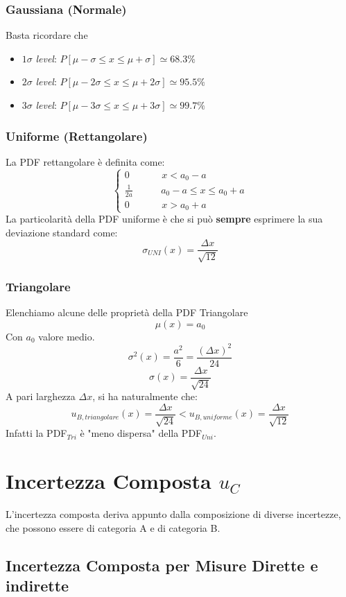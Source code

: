 \documentclass[a4paper,11pt]{report}
\begin{document}
\subsubsection{Gaussiana (Normale)}
Basta ricordare che
\begin{center}
\begin{itemize}
  \item $1\sigma$ \textit{level}: $P[\mu-\sigma \le x \le \mu+\sigma] \simeq 68.3\%$
  \item $2\sigma$ \textit{level}: $P[\mu-2\sigma \le x \le \mu+2\sigma] \simeq 95.5\%$
    \item $3\sigma$ \textit{level}: $P[\mu-3\sigma \le x \le \mu+3\sigma] \simeq 99.7\%$
\end{itemize}  
\end{center}
\subsubsection{Uniforme (Rettangolare)}
La PDF rettangolare è definita come:
\begin{equation}
   \begin{cases}
   0~~~~~~~~~~~~~~~x < a_0 -a\\
   \frac{1}{2a}~~~~~~~~~~~~~a_0 -a \le x \le a_0 + a\\
   0~~~~~~~~~~~~~~~x > a_0 +a
   \end{cases}
\end{equation}
La particolarità della PDF uniforme è che si può \textbf{sempre} esprimere la sua deviazione standard come:
$$
  \sigma_{UNI}(x) = \frac{\Delta x}{\sqrt{12}}
$$
\subsubsection{Triangolare}
Elenchiamo alcune delle proprietà della PDF Triangolare
$$
  \mu(x) = a_0
$$
Con $a_0$ valore medio.
$$
  \sigma^2(x) = \frac{a^2}{6} = \frac{(\Delta x)^2}{24}
$$
$$
  \sigma(x) = \frac{\Delta x}{\sqrt{24}}
$$
A pari larghezza $\Delta x$, si ha naturalmente che:
$$
  u_{B,triangolare}(x) = \frac{\Delta x}{\sqrt{24}} < u_{B,uniforme}(x) = \frac{\Delta x}{\sqrt{12}}
$$
Infatti la PDF$_{Tri}$ è "meno dispersa" della PDF$_{Uni}$.
\newpage
\section{Incertezza Composta $u_C$}
L'incertezza composta deriva appunto dalla composizione di diverse incertezze, che possono essere di categoria A e di categoria B.
\subsection{Incertezza Composta per Misure Dirette e indirette}
\end{document}

